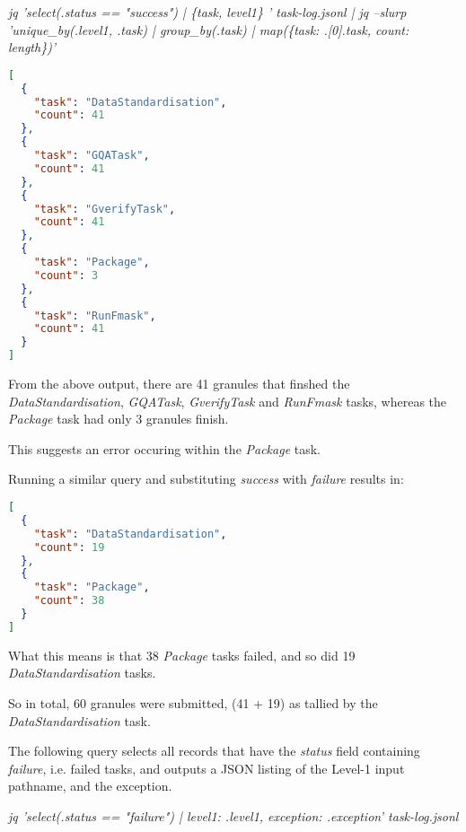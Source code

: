 \documentclass[a4paper,oneside,titlepage]{article}
\begin{document}
    \begin{flushleft}
      \textit{{\tiny jq 'select(.status == "success") |
      \{task, level1\} ' task-log.jsonl |
      jq --slurp 'unique\_by(.level1, .task) |
      group\_by(.task) |
      map(\{task: .[0].task, count: length\})'}}
    \end{flushleft}

    \begin{lstlisting}[basicstyle=\tiny, language=json]
[
  {
    "task": "DataStandardisation",
    "count": 41
  },
  {
    "task": "GQATask",
    "count": 41
  },
  {
    "task": "GverifyTask",
    "count": 41
  },
  {
    "task": "Package",
    "count": 3
  },
  {
    "task": "RunFmask",
    "count": 41
  }
]
    \end{lstlisting}

    \begin{flushleft}
      From the above output, there are 41 granules that finshed the \textit{DataStandardisation}, \textit{GQATask}, \textit{GverifyTask} and \textit{RunFmask} tasks, whereas the \textit{Package} task had only 3 granules finish. \par
      This suggests an error occuring within the \textit{Package} task. \par
      Running a similar query and substituting \textit{success} with \textit{failure} results in:
    \end{flushleft}

    \begin{lstlisting}[basicstyle=\tiny, language=json]
[
  {
    "task": "DataStandardisation",
    "count": 19
  },
  {
    "task": "Package",
    "count": 38
  }
]
    \end{lstlisting}

    \begin{flushleft}
      What this means is that 38 \textit{Package} tasks failed, and so did 19 \textit{DataStandardisation} tasks. \par
      So in total, 60 granules were submitted, (41 + 19) as tallied by the \textit{DataStandardisation} task.
    \end{flushleft}

    \begin{flushleft}
      The following query selects all records that have the \textit{status} field containing \textit{failure}, i.e. failed tasks, and outputs a JSON listing of the Level-1 input pathname, and the exception. \par
      \textit{{\tiny jq 'select(.status == "failure") | {level1: .level1, exception: .exception}' task-log.jsonl}}
    \end{flushleft}
\end{document}
